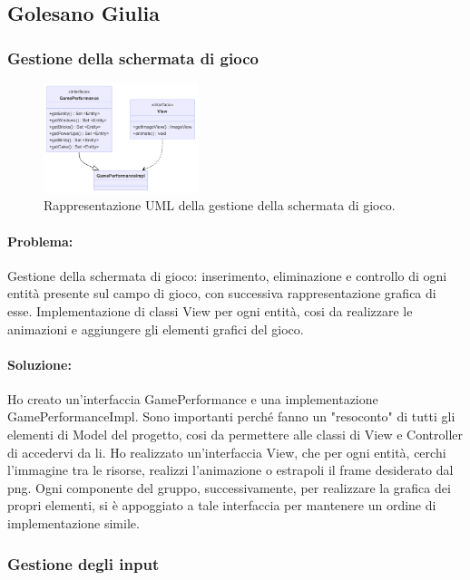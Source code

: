\documentclass[a4paper,12pt]{report}
\begin{document}
\subsection{Golesano Giulia}

\subsubsection{Gestione della schermata di gioco}

\begin{figure}[H]
\centering{}
\includegraphics[width=0.4\textwidth]{img/game.png}
\caption{Rappresentazione UML della gestione della schermata di gioco.}
\end{figure}

\paragraph{Problema:}
Gestione della schermata di gioco: inserimento, eliminazione e controllo di ogni entità presente sul campo di gioco, con successiva rappresentazione grafica di esse.
Implementazione di classi View per ogni entità, cosi da realizzare le animazioni e aggiungere gli elementi grafici del gioco.

\paragraph{Soluzione:}
Ho creato un'interfaccia GamePerformance e una implementazione GamePerformanceImpl.
Sono importanti perché fanno un "resoconto" di tutti gli elementi di Model del progetto, cosi da permettere alle classi di View e Controller di accedervi da li.
Ho realizzato un'interfaccia View, che per ogni entità, cerchi l'immagine tra le risorse, realizzi l'animazione o estrapoli il frame desiderato dal png.
Ogni componente del gruppo, successivamente, per realizzare la grafica dei propri elementi, si è appoggiato a tale interfaccia per mantenere un ordine di implementazione simile.

\subsubsection{Gestione degli input }
\end{document}
